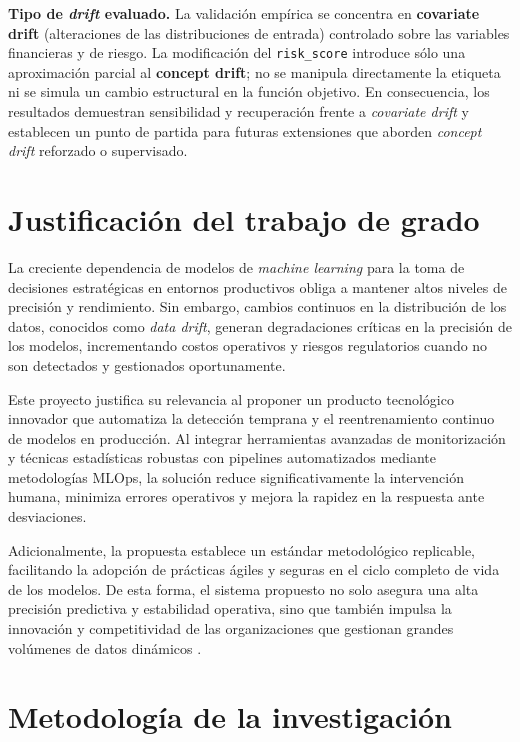 \textbf{Tipo de \textit{drift} evaluado.} La validación empírica se concentra en \textbf{covariate drift} (alteraciones de las distribuciones de entrada) controlado sobre las variables financieras y de riesgo. La modificación del \texttt{risk\_score} introduce sólo una aproximación parcial al \textbf{concept drift}; no se manipula directamente la etiqueta ni se simula un cambio estructural en la función objetivo. En consecuencia, los resultados demuestran sensibilidad y recuperación frente a \textit{covariate drift} y establecen un punto de partida para futuras extensiones que aborden \textit{concept drift} reforzado o supervisado.

\section{Justificación del trabajo de grado}
La creciente dependencia de modelos de \emph{machine learning} para la toma de decisiones estratégicas en entornos productivos obliga a mantener altos niveles de precisión y rendimiento. Sin embargo, cambios continuos en la distribución de los datos, conocidos como \emph{data drift}, generan degradaciones críticas en la precisión de los modelos, incrementando costos operativos y riesgos regulatorios cuando no son detectados y gestionados oportunamente.

Este proyecto justifica su relevancia al proponer un producto tecnológico innovador que automatiza la detección temprana y el reentrenamiento continuo de modelos en producción. Al integrar herramientas avanzadas de monitorización y técnicas estadísticas robustas con pipelines automatizados mediante metodologías MLOps, la solución reduce significativamente la intervención humana, minimiza errores operativos y mejora la rapidez en la respuesta ante desviaciones.

Adicionalmente, la propuesta establece un estándar metodológico replicable, facilitando la adopción de prácticas ágiles y seguras en el ciclo completo de vida de los modelos. De esta forma, el sistema propuesto no solo asegura una alta precisión predictiva y estabilidad operativa, sino que también impulsa la innovación y competitividad de las organizaciones que gestionan grandes volúmenes de datos dinámicos \citep{Kim2018, Merkel2014, Breck2019, Gama2014}.

\section{Metodología de la investigación}
\label{sec:metodologia}

